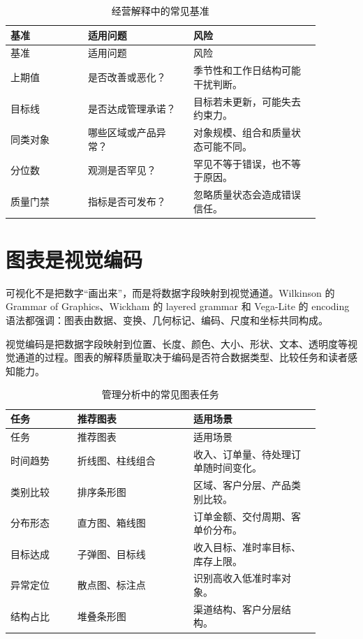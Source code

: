 \documentclass[UTF8,fontset=fandol,openany,zihao=-4]{ctexbook}
\begin{document}
\begin{longtable}{>{\raggedright\arraybackslash}p{0.22\linewidth}>{\raggedright\arraybackslash}p{0.30\linewidth}>{\raggedright\arraybackslash}p{0.36\linewidth}}
\caption{经营解释中的常见基准}\\
\toprule
基准 & 适用问题 & 风险\\
\midrule
\endfirsthead
\toprule
基准 & 适用问题 & 风险\\
\midrule
\endhead
上期值 & 是否改善或恶化？ & 季节性和工作日结构可能干扰判断。\\
目标线 & 是否达成管理承诺？ & 目标若未更新，可能失去约束力。\\
同类对象 & 哪些区域或产品异常？ & 对象规模、组合和质量状态可能不同。\\
分位数 & 观测是否罕见？ & 罕见不等于错误，也不等于原因。\\
质量门禁 & 指标是否可发布？ & 忽略质量状态会造成错误信任。\\
\bottomrule
\end{longtable}

\section{图表是视觉编码}

可视化不是把数字“画出来”，而是将数据字段映射到视觉通道。Wilkinson 的 Grammar of Graphics、Wickham 的 layered grammar 和 Vega-Lite 的 encoding 语法都强调：图表由数据、变换、几何标记、编码、尺度和坐标共同构成。

\begin{definition}[视觉编码]
视觉编码是把数据字段映射到位置、长度、颜色、大小、形状、文本、透明度等视觉通道的过程。图表的解释质量取决于编码是否符合数据类型、比较任务和读者感知能力。
\end{definition}

\begin{longtable}{>{\raggedright\arraybackslash}p{0.19\linewidth}>{\raggedright\arraybackslash}p{0.33\linewidth}>{\raggedright\arraybackslash}p{0.36\linewidth}}
\caption{管理分析中的常见图表任务}\\
\toprule
任务 & 推荐图表 & 适用场景\\
\midrule
\endfirsthead
\toprule
任务 & 推荐图表 & 适用场景\\
\midrule
\endhead
时间趋势 & 折线图、柱线组合 & 收入、订单量、待处理订单随时间变化。\\
类别比较 & 排序条形图 & 区域、客户分层、产品类别比较。\\
分布形态 & 直方图、箱线图 & 订单金额、交付周期、客单价分布。\\
目标达成 & 子弹图、目标线 & 收入目标、准时率目标、库存上限。\\
异常定位 & 散点图、标注点 & 识别高收入低准时率对象。\\
结构占比 & 堆叠条形图 & 渠道结构、客户分层结构。\\
\bottomrule
\end{longtable}
\end{document}
